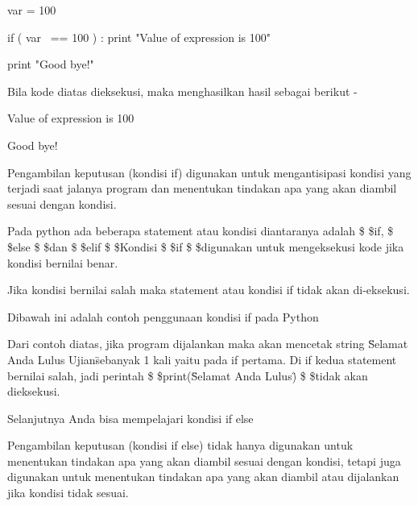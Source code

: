 \vspace{12pt}
\vspace{12pt}
\noindent 
var = 100 \par
\vspace{12pt}
\noindent 
if ( var~ == 100 ) : print "Value of expression is 100" \par
\vspace{12pt}
\noindent 
print "Good bye!" \par
\vspace{12pt}
\noindent 
Bila kode diatas dieksekusi, maka menghasilkan hasil sebagai berikut - \par
\vspace{12pt}
\noindent 
Value of expression is 100 \par
\vspace{12pt}
\noindent 
Good bye! \hspace*{1.31in}  \par
\noindent 
\vspace{12pt}
\noindent 
Pengambilan keputusan (kondisi if) digunakan untuk mengantisipasi kondisi yang terjadi saat jalanya program dan menentukan tindakan apa yang akan diambil sesuai dengan kondisi. \par
\noindent 
\vspace{12pt}
\noindent 
Pada python ada beberapa statement atau kondisi diantaranya adalah \$  \$if, \$  \$else \$  \$dan \$  \$elif \$  \$Kondisi \$  \$if \$  \$digunakan untuk mengeksekusi kode jika kondisi bernilai benar. \par
\noindent 
\vspace{12pt}
\noindent 
Jika kondisi bernilai salah maka statement atau kondisi if tidak akan di-eksekusi. \par
\noindent 
\vspace{\baselineskip}
Dibawah ini adalah contoh penggunaan kondisi if pada Python \par
\noindent 
\vspace{\baselineskip}
Dari contoh diatas, jika program dijalankan maka akan mencetak string \"Selamat Anda Lulus Ujian\" sebanyak 1 kali yaitu pada if pertama. Di if kedua statement bernilai salah, jadi perintah \$  \$print(\"Selamat Anda Lulus\") \$  \$tidak akan dieksekusi. \par
\noindent 
\vspace{\baselineskip}
Selanjutnya Anda bisa mempelajari kondisi if else \par
\vspace{12pt}
\noindent 
Pengambilan keputusan (kondisi if else) tidak hanya digunakan untuk menentukan tindakan apa yang akan diambil sesuai dengan kondisi, tetapi juga digunakan untuk menentukan tindakan apa yang akan diambil atau dijalankan jika kondisi tidak sesuai.\vspace{\baselineskip}
